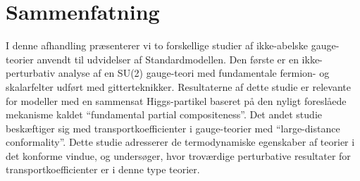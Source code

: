 \chapter*{Sammenfatning}

I denne afhandling pr{\ae}senterer vi to forskellige studier af ikke-abelske gauge-teorier anvendt til udvidelser af Standardmodellen. Den f{\o}rste er en ikke-perturbativ analyse af en SU(2) gauge-teori med fundamentale fermion- og skalarfelter udf{\o}rt med gitterteknikker. Resultaterne af dette studie er relevante for modeller med en sammensat Higgs-partikel baseret p{\aa} den nyligt foresl{\aa}ede mekanisme kaldet ``fundamental partial compositeness''. Det andet studie besk{\ae}ftiger sig med transportkoefficienter i gauge-teorier med ``large-distance conformality''. Dette studie adresserer de termodynamiske egenskaber af teorier i det konforme vindue, og unders{\o}ger, hvor trov{\ae}rdige perturbative resultater for transportkoefficienter er i denne type teorier.

